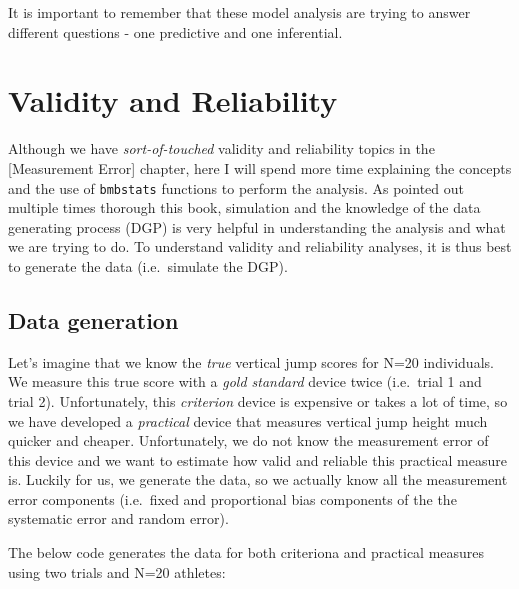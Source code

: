 \documentclass[
]{book}
\begin{document}
It is important to remember that these model analysis are trying to answer different questions - one predictive and one inferential.

\hypertarget{validity-and-reliability}{%
\chapter{Validity and Reliability}\label{validity-and-reliability}}

Although we have \emph{sort-of-touched} validity and reliability topics in the {[}Measurement Error{]} chapter, here I will spend more time explaining the concepts and the use of \texttt{bmbstats} functions to perform the analysis. As pointed out multiple times thorough this book, simulation and the knowledge of the data generating process (DGP) is very helpful in understanding the analysis and what we are trying to do. To understand validity and reliability analyses, it is thus best to generate the data (i.e.~simulate the DGP).

\hypertarget{data-generation}{%
\section{Data generation}\label{data-generation}}

Let's imagine that we know the \emph{true} vertical jump scores for N=20 individuals. We measure this true score with a \emph{gold standard} device twice (i.e.~trial 1 and trial 2). Unfortunately, this \emph{criterion} device is expensive or takes a lot of time, so we have developed a \emph{practical} device that measures vertical jump height much quicker and cheaper. Unfortunately, we do not know the measurement error of this device and we want to estimate how valid and reliable this practical measure is. Luckily for us, we generate the data, so we actually know all the measurement error components (i.e.~fixed and proportional bias components of the the systematic error and random error).

The below code generates the data for both criteriona and practical measures using two trials and N=20 athletes:
\end{document}
